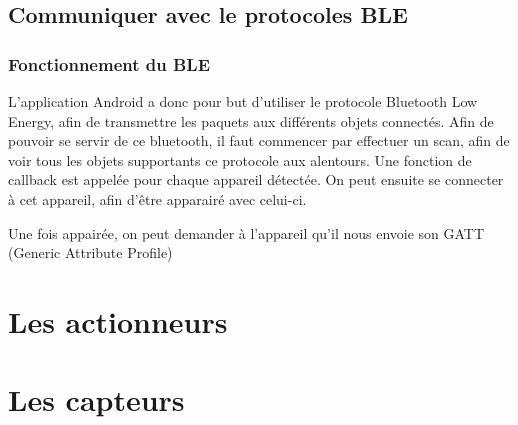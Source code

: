	\subsection{Communiquer avec le protocoles BLE}
	  \subsubsection{Fonctionnement du BLE}
L'application Android a donc pour but d'utiliser le protocole Bluetooth Low Energy, afin de transmettre les 
paquets aux différents objets connectés. Afin de pouvoir se servir de ce bluetooth, il faut commencer par 
effectuer un scan, afin de voir tous les objets supportants ce protocole aux alentours. Une fonction de 
callback est appelée pour chaque appareil détectée. On peut ensuite se connecter à cet appareil, afin d'être 
apparairé avec celui-ci.

Une fois appairée, on peut demander à l'appareil qu'il nous envoie son GATT (Generic Attribute Profile)




\section{Les actionneurs}
\section{Les capteurs}


